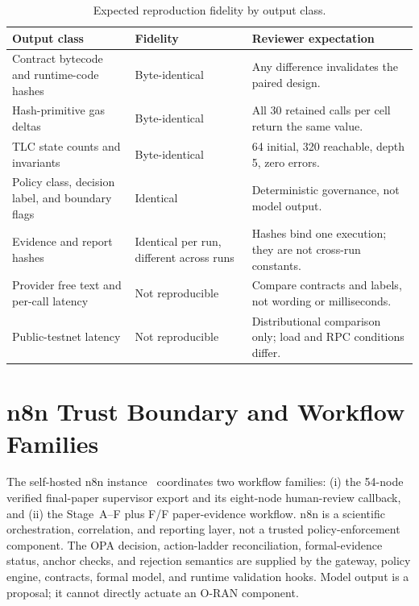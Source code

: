 \documentclass[journal]{IEEEtran}
\newif\ifshowrevisions
\newcommand{\rev}[1]{{\ifshowrevisions\color{blue}\else\color{black}\fi #1}}
\begin{document}
\begin{table}[!t]
\centering
\caption{Expected reproduction fidelity by output class.}
\label{tab:determinism}
\begin{adjustbox}{width=\columnwidth}
\begin{tabular}{L{3.0cm}L{2.0cm}L{3.1cm}}
\toprule
Output class & Fidelity & Reviewer expectation \\
\midrule
Contract bytecode and runtime-code hashes & Byte-identical & Any difference
invalidates the paired design. \\
Hash-primitive gas deltas & Byte-identical & All 30 retained calls per cell
return the same value. \\
TLC state counts and invariants & Byte-identical & 64 initial, 320 reachable,
depth 5, zero errors. \\
Policy class, decision label, and boundary flags & Identical & Deterministic
governance, not model output. \\
Evidence and report hashes & Identical per run, different across runs &
Hashes bind one execution; they are not cross-run constants. \\
Provider free text and per-call latency & Not reproducible & Compare
contracts and labels, not wording or milliseconds. \\
Public-testnet latency & Not reproducible & Distributional comparison only;
load and RPC conditions differ. \\
\bottomrule
\end{tabular}
\end{adjustbox}
\end{table}

\section{n8n Trust Boundary and Workflow Families}
\label{sec:n8n-boundary}

The self-hosted n8n instance~\rev{\cite{n8n}} coordinates two workflow families: (i) the
54-node verified final-paper supervisor export and its eight-node human-review
callback, and (ii) the Stage~A--F plus F/F paper-evidence workflow. n8n is a
scientific orchestration, correlation, and reporting layer, not a trusted
policy-enforcement component. The OPA decision, action-ladder reconciliation,
formal-evidence status, anchor checks, and rejection semantics are supplied by
the gateway, policy engine, contracts, formal model, and runtime validation
hooks. Model output is a proposal; it cannot directly actuate an O-RAN
component.
\end{document}
